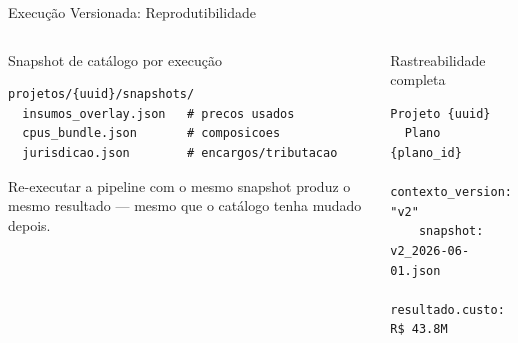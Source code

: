 \documentclass[aspectratio=169,10pt]{beamer}
\begin{document}
\begin{frame}{Execução Versionada: Reprodutibilidade}
  \begin{columns}[T]
    \begin{block}{Snapshot de catálogo por execução}
      \begin{lstlisting}
projetos/{uuid}/snapshots/
  insumos_overlay.json   # precos usados
  cpus_bundle.json       # composicoes
  jurisdicao.json        # encargos/tributacao
      \end{lstlisting}
      \vspace{2pt}
      {\scriptsize Re-executar a pipeline com o mesmo snapshot
      produz o mesmo resultado --- mesmo que o catálogo tenha
      mudado depois.}
    \end{block}
    \vspace{4pt}
    \begin{block}{Rastreabilidade completa}
      \begin{lstlisting}
Projeto {uuid}
  Plano {plano_id}
    contexto_version: "v2"
    snapshot: v2_2026-06-01.json
    resultado.custo: R$ 43.8M
      \end{lstlisting}
    \end{block}


\end{columns}
\end{frame}
\end{document}
